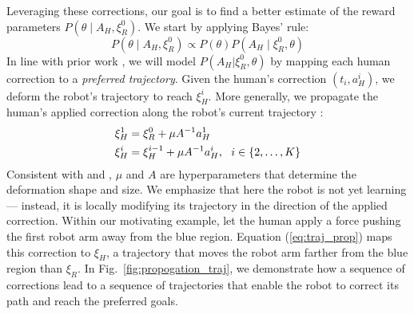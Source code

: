 Leveraging these corrections, our goal is to find a better estimate of the reward parameters $P(\theta \mid A_H, \xi_R^0)$. We start by applying Bayes' rule:
\begin{equation} \label{eq:bayes}
   P(\theta \mid A_H, \xi_R^0) \propto P(\theta) P(A_H \mid \xi_R^0,\theta)
\end{equation}
In line with prior work \cite{bajcsy2017learning, bajcsy2018learning, losey2018including, bobu2020quantifying}, we will model $P(A_H|\xi_R^0, \theta)$ by mapping each human correction to a \textit{preferred trajectory}. Given the human's correction $(t_i, a_H^i)$, we deform the robot's trajectory to reach $\xi_H^i$. 
 More generally, we propagate the human's applied correction along the robot's current trajectory \cite{losey2017trajectory}:
\begin{eqnarray}
\centering
\begin{aligned}
    \xi_H^1 &= \xi_R^0 + \mu A^{-1} a_H^1\\
    \xi_H^i &= \xi_H^{i-1} + \mu A^{-1} a_H^i ,~~ i \in \{2,\ldots, K\}
\end{aligned}
\label{eq:traj_prop}
\end{eqnarray}
Consistent with \cite{losey2017trajectory} and \cite{dragan2015movement}, $\mu$ and $A$ are hyperparameters that determine the deformation shape and size. We emphasize that here the robot is not yet learning --- instead, it is locally modifying its trajectory in the direction of the applied correction. Within our motivating example, let the human apply a force pushing the first robot arm away from the blue region. Equation (\ref{eq:traj_prop}) maps this correction to $\xi_H$, a trajectory that moves the robot arm farther from the blue region than $\xi_R$. In Fig.~\ref{fig:propogation_traj}, we demonstrate how a sequence of corrections lead to a sequence of trajectories that enable the robot to correct its path and reach the preferred goals.


